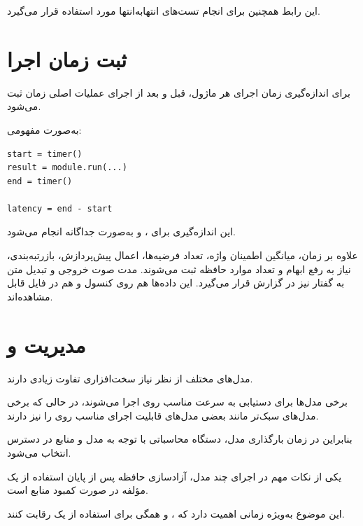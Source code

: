 این رابط همچنین برای انجام تست‌های انتهابه‌انتها مورد استفاده
قرار می‌گیرد.


\section{ثبت زمان اجرا}

برای اندازه‌گیری زمان اجرای هر ماژول، قبل و بعد از اجرای
عملیات اصلی زمان ثبت می‌شود.

به‌صورت مفهومی:

\begin{latin}\begin{verbatim}
start = timer()
result = module.run(...)
end = timer()

latency = end - start
\end{verbatim}\end{latin}

این اندازه‌گیری برای ،  و  به‌صورت جداگانه انجام
می‌شود.

علاوه بر زمان، میانگین اطمینان واژه، تعداد فرضیه‌ها، اعمال
پیش‌پردازش، بازرتبه‌بندی، نیاز به رفع ابهام و تعداد موارد حافظه
ثبت می‌شوند. مدت صوت خروجی و  تبدیل متن به گفتار نیز در
گزارش قرار می‌گیرد. این داده‌ها هم روی کنسول و هم در فایل
 قابل مشاهده‌اند.


\section{مدیریت  و }

مدل‌های مختلف از نظر نیاز سخت‌افزاری تفاوت زیادی دارند.

برخی مدل‌ها برای دستیابی به سرعت مناسب روی  اجرا می‌شوند،
در حالی که برخی مدل‌های سبک‌تر مانند بعضی مدل‌های 
قابلیت اجرای مناسب روی  را نیز دارند.

بنابراین در زمان بارگذاری مدل، دستگاه محاسباتی با توجه به
مدل و منابع در دسترس انتخاب می‌شود.

یکی از نکات مهم در اجرای چند مدل، آزادسازی حافظه پس از پایان
استفاده از یک مؤلفه در صورت کمبود منابع است.

این موضوع به‌ویژه زمانی اهمیت دارد که ،  و  همگی
برای استفاده از یک  رقابت کنند.


